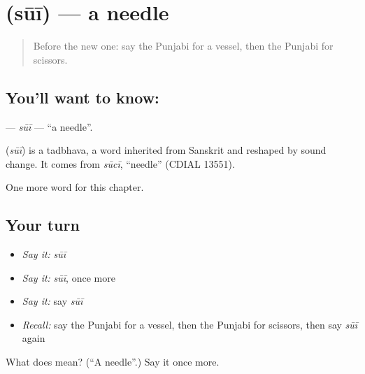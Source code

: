 \section[\texorpdfstring{\pa{ਸੂਈ} (sūī)}{ਸੂਈ (sūī)}]{ (sūī) — a needle}

\label{lesson:PA-C115-sui}



\begin{quote}
Before the new one: say the Punjabi for a vessel, then the Punjabi for scissors.
\end{quote}

\subsection*{You'll want to know: }
\textbf{} — \emph{sūī} — \textquotedblleft{}a needle\textquotedblright{}.

\begin{cousinweb}
\textbf{} (\emph{sūī}) is a tadbhava, a word inherited from Sanskrit and reshaped by sound change. It comes from \emph{sūcī}, \textquotedblleft{}needle\textquotedblright{} (CDIAL 13551).
\end{cousinweb}

\begin{grammarlens}[title={What you've built}]
One more word for this chapter.
\end{grammarlens}

\subsection*{Your turn}
\begin{itemize}
\raggedright
  \item \emph{Say it:} \emph{sūī}
  \item \emph{Say it:} \emph{sūī}, once more
  \item \emph{Say it:} say \emph{sūī}
  \item \emph{Recall:} say the Punjabi for a vessel, then the Punjabi for scissors, then say \emph{sūī} again
\end{itemize}

\begin{tcolorbox}[breakable,colback=teal!4,colframe=teal!35!black,title={Before you move on}]
What does  mean? (\textquotedblleft{}A needle\textquotedblright{}.) Say it once more.
\end{tcolorbox}

